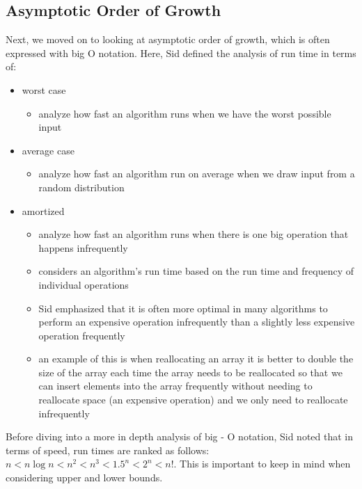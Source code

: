 \subsection{Asymptotic Order of Growth}
Next, we moved on to looking at asymptotic order of growth, which is often expressed with big O notation. Here, Sid defined the analysis of run time in terms of:
\begin{itemize}
    \item worst case
    \begin{itemize}
        \item analyze how fast an algorithm runs when we have the worst possible input
    \end{itemize}
    \item average case
    \begin{itemize}
        \item analyze how fast an algorithm run on average when we  draw input from a random distribution 
    \end{itemize}
    \item amortized
    \begin{itemize}
        \item analyze how fast an algorithm runs when there is one big operation that happens infrequently
        \item considers an algorithm's run time based on the run time and frequency of individual operations
        \item Sid emphasized that it is often more optimal in many algorithms to perform an expensive operation infrequently than a slightly less expensive operation frequently
        \item an example of this is when reallocating an array it is better to double the size of the array each time the array needs to be reallocated so that we can insert elements into the array frequently without needing to reallocate space (an expensive operation) and we only need to reallocate infrequently
    \end{itemize}
\end{itemize}
\vspace{3mm}
Before diving into a more in depth analysis of big - O notation, Sid noted that in terms of speed, run times are ranked as follows: $n < n\log n < n^2 < n^3 < {1.5}^n < 2^n <n!$. This is important to keep in mind when considering upper and lower bounds.

